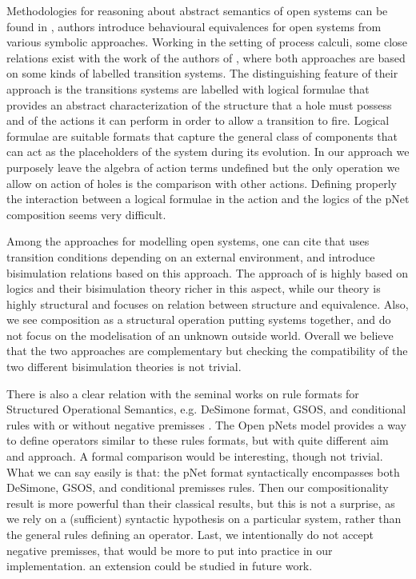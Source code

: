 \documentclass{elsarticle}
\begin{document}
Methodologies for reasoning about abstract semantics of open systems can be found in \cite{BaldanBB:2002, BaldanBB:07,Dubut:20}, authors introduce  behavioural equivalences for open systems from various symbolic approaches. Working in the setting of process calculi, some close relations  exist with the work  of the authors of \cite{BaldanBB:2002,BaldanBB:07}, where both approaches are based
on some kinds of labelled transition systems. The distinguishing feature of their approach is the transitions systems are labelled with logical formulae that provides  an abstract characterization of the structure that a hole must possess and of the actions it can perform in order to allow a transition to fire. Logical formulae are suitable formats that capture the general class of components that can act as the placeholders of the system during its evolution. In our approach we purposely leave the algebra of action terms undefined but the only operation we allow on action of holes is the comparison with other actions. Defining properly the interaction between a logical formulae in the action and the logics of the pNet composition seems very difficult.

Among the approaches for modelling open systems, one can cite  \cite{Beohar:2020} that uses transition conditions depending on an external environment, and introduce bisimulation relations based on this approach. The approach of  \cite{Beohar:2020} is 
  highly based on logics and their bisimulation theory richer in this aspect, while our theory is highly structural and focuses on relation between structure and equivalence. Also, we see composition as a structural operation putting systems together, and do not focus on the modelisation of an unknown outside world. Overall we believe that the two approaches are complementary but checking the compatibility of the two different bisimulation theories is not  trivial.


There is also a clear relation with the seminal works on rule formats for Structured Operational Semantics, e.g. DeSimone format, GSOS, and conditional rules with or without negative premisses \cite{deSimone85,Bloom88bisimulationcant,GROOTE1992202,VANGLABBEEK2004229}.  The Open pNets model provides a way to define operators similar to these rules formats, but with quite different aim and approach. A formal comparison would be interesting, though not trivial. What we can say easily is that: the pNet format syntactically encompasses both DeSimone, GSOS, and conditional premisses rules. Then our compositionality result is more powerful than their classical results, but this is not a surprise, as we rely on a (sufficient) syntactic hypothesis on a particular system, rather than the general rules defining an operator.  Last, we intentionally do not accept negative premisses, that would be more  to put into practice in our implementation. an extension could be studied in future work.
\end{document}
